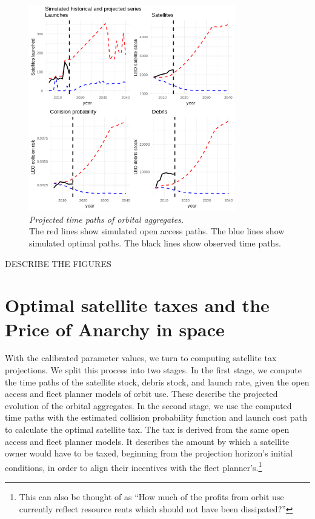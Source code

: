 \documentclass[12pt]{article}
\begin{document}
\begin{figure}[H]
	\centering
	\includegraphics[width=0.8\textwidth]{../../images/simulated_projected_series.png}
	\captionsetup{format=hang}
	\caption[Projected time paths of orbital aggregates]{\textit{Projected time paths of orbital aggregates.} \\
		The red lines show simulated open access paths. The blue lines show simulated optimal paths. The black lines show observed time paths.
	}
	\label{simulated_projected_path_of_states}
\end{figure}

DESCRIBE THE FIGURES

\section{Optimal satellite taxes and the Price of Anarchy in space}

With the calibrated parameter values, we turn to computing satellite tax projections. We split this process into two stages. In the first stage, we compute the time paths of the satellite stock, debris stock, and launch rate, given the open access and fleet planner models of orbit use. These describe the projected evolution of the orbital aggregates. In the second stage, we use the computed time paths with the estimated collision probability function and launch cost path to calculate the optimal satellite tax. The tax is derived from the same open access and fleet planner models. It describes the amount by which a satellite owner would have to be taxed, beginning from the projection horizon's initial conditions, in order to align their incentives with the fleet planner's.\footnote{This can also be thought of as ``How much of the profits from orbit use currently reflect resource rents which should not have been dissipated?'' }\\
\end{document}
